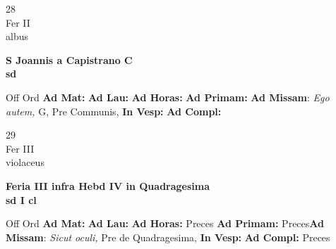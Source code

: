 \documentclass[10pt, openany]{book}
\begin{document}
        \begin{center}
            \begin{minipage}{3.5in}
                \vspace{2em}
                \begin{minipage}{0.5in}
                    {\Huge 28} \\
                    {\normalsize Fer II} \\
                    {\normalsize albus}
                \end{minipage}
                \begin{minipage}{3.0in}
                    \textbf{ \large S Joannis a Capistrano C \\
                    \textnormal{\normalsize sd}} \\ 
                \end{minipage}
                \begin{justify}Off Ord
                    \textbf{Ad Mat: }
                    \textbf{Ad Lau: }
                    \textbf{Ad Horas: }
                    \textbf{Ad Primam: }\textbf{Ad Missam}: \textit{Ego autem,} G, Pre Communis,  
                    \textbf{In Vesp: }
                    \textbf{Ad Compl: }
                \end{justify}
            \end{minipage}
        \end{center}
    
        \begin{center}
            \begin{minipage}{3.5in}
                \vspace{2em}
                \begin{minipage}{0.5in}
                    {\Huge 29} \\
                    {\normalsize Fer III} \\
                    {\normalsize violaceus}
                \end{minipage}
                \begin{minipage}{3.0in}
                    \textbf{ \large Feria III infra Hebd IV in Quadragesima  \\
                    \textnormal{\normalsize sd I cl}} \\ 
                \end{minipage}
                \begin{justify}Off Ord
                    \textbf{Ad Mat: }
                    \textbf{Ad Lau: }
                    \textbf{Ad Horas: }Preces
                    \textbf{Ad Primam: }Preces\textbf{Ad Missam}: \textit{Sicut oculi,} Pre de Quadragesima,  
                    \textbf{In Vesp: }
                    \textbf{Ad Compl: }Preces
                \end{justify}
            \end{minipage}
        \end{center}
    
\end{document}
